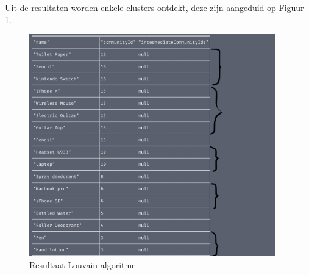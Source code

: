 Uit de resultaten worden enkele clusters ontdekt, deze zijn aangeduid op Figuur \ref{fig:LouvainResult}.

\begin{figure} [ht]
	\centering
	\includegraphics[width=0.95\textwidth]{img/Louvain_result}
	\caption{Resultaat Louvain algoritme}
	\label{fig:LouvainResult}
\end{figure}



